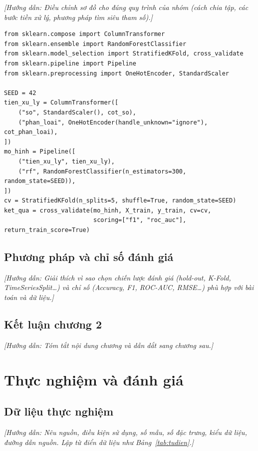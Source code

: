 \documentclass[12pt,a4paper,oneside]{report}
\newcommand{\huongdan}[1]{{\color{guide}\itshape [Hướng dẫn: #1]}}
\begin{document}
\huongdan{Điều chỉnh sơ đồ cho đúng quy trình của nhóm (cách chia tập, các
bước tiền xử lý, phương pháp tìm siêu tham số).}

\begin{lstlisting}[caption={Xây dựng Pipeline và kiểm định chéo},label={lst:pipeline}]
from sklearn.compose import ColumnTransformer
from sklearn.ensemble import RandomForestClassifier
from sklearn.model_selection import StratifiedKFold, cross_validate
from sklearn.pipeline import Pipeline
from sklearn.preprocessing import OneHotEncoder, StandardScaler

SEED = 42
tien_xu_ly = ColumnTransformer([
    ("so", StandardScaler(), cot_so),
    ("phan_loai", OneHotEncoder(handle_unknown="ignore"), cot_phan_loai),
])
mo_hinh = Pipeline([
    ("tien_xu_ly", tien_xu_ly),
    ("rf", RandomForestClassifier(n_estimators=300, random_state=SEED)),
])
cv = StratifiedKFold(n_splits=5, shuffle=True, random_state=SEED)
ket_qua = cross_validate(mo_hinh, X_train, y_train, cv=cv,
                         scoring=["f1", "roc_auc"], return_train_score=True)
\end{lstlisting}

\section{Phương pháp và chỉ số đánh giá}
\huongdan{Giải thích vì sao chọn chiến lược đánh giá (hold-out, K-Fold,
TimeSeriesSplit\dots) và chỉ số (Accuracy, F1, ROC-AUC, RMSE\dots) phù hợp
với bài toán và dữ liệu.}

\section{Kết luận chương 2}
\huongdan{Tóm tắt nội dung chương và dẫn dắt sang chương sau.}

\chapter{Thực nghiệm và đánh giá}
\label{chap:thucnghiem}

\section{Dữ liệu thực nghiệm}
\huongdan{Nêu nguồn, điều kiện sử dụng, số mẫu, số đặc trưng, kiểu dữ liệu,
đường dẫn nguồn. Lập từ điển dữ liệu như Bảng~\ref{tab:tudien}.}
\end{document}
